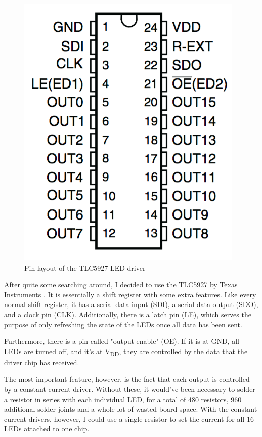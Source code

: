 \documentclass[a4paper, 11pt, titlepage]{report}
\def \vdd {V\textsubscript{DD}}
\begin{document}
\newpage


\begin{figure}

\includegraphics[scale=0.35]{./images/tlc-pins.png}
\caption{Pin layout of the TLC5927 LED driver}

\end{figure}

After quite some searching around, I decided to use the TLC5927 by Texas Instruments \cite{tlc,
tlcdigikey}. It is essentially a shift register with some extra features. Like every normal shift
register, it has a serial data input (SDI), a serial data output (SDO), and a clock pin (CLK).
Additionally, there is a latch pin (LE), which serves the purpose of only refreshing the state of
the LEDs once all data has been sent.

Furthermore, there is a pin called "output enable" (OE). If it is at GND, all LEDs are turned off,
and it's at \vdd, they are controlled by the data that the driver chip has received.

The most important feature, however, is the fact that each output is controlled by a constant
current driver. Without these, it would've been necessary to solder a resistor in series
with each individual LED, for a total of 480 resistors, 960 additional solder joints and a whole
lot of wasted board space. With the constant current drivers, however, I could use a single
resistor to set the current for all 16 LEDs attached to one chip.
\end{document}
